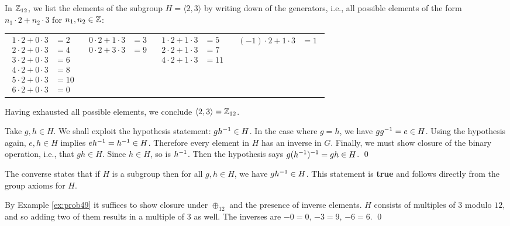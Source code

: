 \documentclass[../algebraNotesMSRI-UP2016.tex]{subfiles}
\begin{document}
\begin{frame}
\begin{ex}[cf. Problem 52]
In $\mathbb Z_{12}$, we list the elements of the subgroup $H=\langle 2,3\rangle$ by writing down  of the generators, i.e., all possible elements of the form $n_1\cdot 2+n_2\cdot 3$ for $n_1,n_2\in\mathbb Z$:

{\footnotesize
\begin{tabular}{p{}p{}p{}p{}}
{\begin{align*}
1\cdot 2 +0\cdot 3 &= 2 \\
2\cdot 2 +0\cdot 3 &= 4 \\
3\cdot 2 +0\cdot 3 &= 6 \\
4\cdot 2 +0\cdot 3 &= 8 \\
5\cdot 2 +0\cdot 3 &= 10 \\
6\cdot 2 +0\cdot 3 &= 0
\end{align*} 
} & 
{\begin{align*}
0\cdot 2 +1\cdot 3 &= 3 \\
0\cdot 2 +3\cdot 3 &= 9 
\end{align*}
} & 
{\begin{align*}
1\cdot 2 +1\cdot 3 &= 5 \\
2\cdot 2 +1\cdot 3 &= 7 \\
4\cdot 2 +1\cdot 3 &= 11
\end{align*} 
} &
{\begin{align*}
(-1)\cdot 2+1\cdot 3 &= 1
\end{align*}
}
\end{tabular}
}
Having exhausted all possible elements, we conclude $\langle 2,3\rangle=\mathbb Z_{12}$.
\end{ex}
\end{frame}

\answerKey
\begin{frame}{\subsecname}
Take $g,h\in H$.  We shall exploit the hypothesis statement: $gh^{-1}\in H$.  In the case where $g=h$, we have $gg^{-1}=e\in H$.  Using the hypothesis again, $e,h\in H$ implies $eh^{-1}=h^{-1} \in H$.  Therefore every element in $H$ has an inverse in $G$.  Finally, we must show closure of the binary operation, i.e., that $gh\in H$.  Since $h\in H$, so is $h^{-1}$.  Then the hypothesis says $g(h^{-1})^{-1}=gh\in H$.
\qed

\smallGap
The converse states that if $H$ is a subgroup then for all $g,h\in H$, we have $gh^{-1}\in H$.  This statement is \textbf{true} and follows directly from the group axioms for $H$.

\smallGap
{}
By Example \ref{ex:prob49} it suffices to show closure under $\oplus_{12}$ and the presence of inverse elements.  $H$ consists of multiples of $3$ modulo $12$, and so adding two of them results in a multiple of $3$ as well.  The inverses are $-0=0$, $-3=9$, $-6=6$.
\qed
\end{frame}
\end{document}
